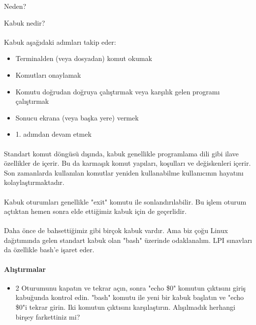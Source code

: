 \documentclass[10pt,a5paper]{book}
\begin{document}
\begin{section}{Neden?}
\begin{subsection}{Kabuk nedir?}
\paragraph{}{Kabuk aşağıdaki adımları takip eder:
\begin{itemize}
\item Terminalden (veya dosyadan) komut okumak
\item Komutları onaylamak
\item Komutu doğrudan doğruya çalıştırmak veya karşılık gelen programı çalıştırmak
\item Sonucu ekrana (veya başka yere) vermek
\item 1. adımdan devam etmek
\end{itemize}}
\paragraph{}{Standart komut döngüsü dışında, kabuk genellikle programlama dili gibi ilave özellikler de içerir. Bu da karmaşık komut yapıları, koşulları ve değiskenleri içerir. Son zamanlarda kullanılan komutlar yeniden kullanabilme kullanıcının hayatını kolaylaştırmaktadır.}
\paragraph{}{Kabuk oturumları genellikle "exit" komutu ile sonlandırılabilir. Bu işlem oturum açtıktan hemen sonra elde ettiğimiz kabuk için de geçerlidir.}
\paragraph{}{Daha önce de bahsettiğimiz gibi birçok kabuk vardır. Ama biz çoğu Linux dağıtımında gelen standart kabuk olan "bash" üzerinde odaklanalım. LPI sınavları da özellikle bash'e işaret eder.}
\paragraph{Alıştırmalar}{}
\begin{itemize}
 \item 2 Oturumunu kapatın ve tekrar açın, sonra "echo \$0" komutun çıktısını giriş kabuğunda kontrol edin. "bash" komutu ile yeni bir kabuk başlatın ve "echo \$0"i tekrar girin. Iki komutun çıktısını karşılaştırın. Alışılmadık herhangi birşey farkettiniz mi?
\end{itemize}
\end{subsection}
\end{section}
\end{document}
